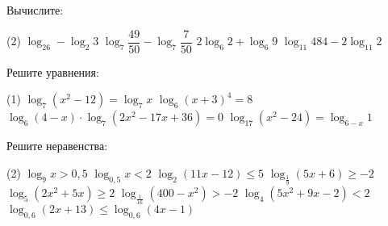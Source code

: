 \begin{exam}
	\begin{listofex}
		\item Вычислите:
		\begin{tasks}(2)
			\task \( \log_26 - \log_2 3 \)
			\task \( \log_7  \dfrac{ 49 }{ 50 } - \log_7 \dfrac{ 7 }{ 50 } \)
			\task \( 2\log_6 2 + \log_6 9 \)
			\task \( \log_{11} 484 - 2 \log_{11} 2  \)
		\end{tasks}
		\item Решите уравнения: %
		\begin{tasks}(1)
			\task \( \log_7 (x^2-12) = \log_7 x \)
			\task \( \log_6 (x+3)^4 = 8 \)
			\task \( \log_6 (4-x) \cdot \log_7 (2x^2-17x+36) = 0 \)
			\task \( \log_{17}(x^2-24)=\log_{6-x}1 \)
		\end{tasks}
		\item Решите неравенства: %
		\begin{tasks}(2)
			\task \( \log_9x > 0,5 \)
			\task \( \log_{0,5} x < 2 \)
			\task \( \log_2(11x-12) \le 5 \)
			\task \( \log_{\tfrac{1}{9}} (5x+6) \ge -2 \)
			\task \( \log_5 (2x^2+5x) \ge 2 \)
			\task \( \log_{\tfrac{1}{16}}(400-x^2) > -2 \)
			\task \( \log_4 (5x^2+9x-2) < 2 \)
			\task \( \log_{0,6}(2x+13) \le \log_{0,6} (4x-1) \)
		\end{tasks}
	\end{listofex}
\end{exam}


